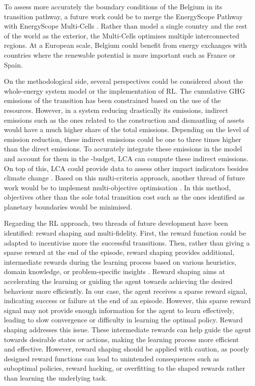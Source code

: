 To assess more accurately the boundary conditions of the Belgium in its transition pathway, a future work could be to merge the EnergyScope Pathway with EnergyScope Multi-Cells \cite{thiran2023validation}. Rather than model a single country and the rest of the world as the exterior, the Multi-Cells optimises multiple interconnected regions. At a European scale, Belgium could benefit from energy exchanges with countries where the renewable potential is more important such as France or Spain. 

On the methodological side, several perspectives could be considered about the whole-energy system model or the implementation of \gls{RL}. The cumulative \acrfull{GHG} emissions of the transition has been constrained based on the use of the resources. However, in a system reducing drastically its emissions, indirect emissions such as the ones related to the construction and dismantling of assets would have a much higher share of the total emissions. Depending on the level of emission reduction, these indirect emissions could be one to three times higher than the direct emissions. To accurately integrate these emissions in the model and account for them in the -budget, \gls{LCA} can compute these indirect emissions. On top of this, \gls{LCA} could provide data to assess other impact indicators besides climate change \cite{astudillo2018integrating}. Based on this multi-criteria approach, another thread of future work would be to implement multi-objective optimisation \cite{dubois2023multi}. In this method, objectives other than the sole total transition cost such as the ones identified as planetary boundaries \cite{richardson2023earth} would be minimised.

Regarding the \gls{RL} approach, two threads of future development have been identified: reward shaping and multi-fidelity.  First, the reward function could be adapted to incentivise more the successful transitions. Then, rather than giving a sparse reward at the end of the episode, reward shaping provides additional, intermediate rewards during the learning process based on various heuristics, domain knowledge, or problem-specific insights \cite{hu2020learning}. Reward shaping aims at accelerating the learning or guiding the agent towards achieving the desired behaviour more efficiently. In our case, the agent receives a sparse reward signal, indicating success or failure at the end of an episode. However, this sparse reward signal may not provide enough information for the agent to learn effectively, leading to slow convergence or difficulty in learning the optimal policy. Reward shaping addresses this issue. These intermediate rewards can help guide the agent towards desirable states or actions, making the learning process more efficient and effective. However, reward shaping should be applied with caution, as poorly designed reward functions can lead to unintended consequences such as suboptimal policies, reward hacking, or overfitting to the shaped rewards rather than learning the underlying task.  

